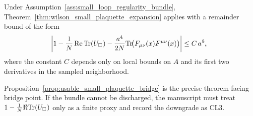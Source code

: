 \begin{proposition}
\label{prop:usable_small_plaquette_bridge}
\MathTag Under Assumption~\ref{ass:small_loop_regularity_bundle}, Theorem~\ref{thm:wilson_small_plaquette_expansion} applies with a remainder bound of the form
\[
\left|
1-\frac{1}{N}\operatorname{Re}\mathrm{Tr}(U_\square)
-\frac{a^{4}}{2N}\mathrm{Tr}\!\bigl(F_{\mu\nu}(x)F^{\mu\nu}(x)\bigr)
\right|
\le C\,a^{6},
\]
where the constant $C$ depends only on local bounds on $A$ and its first two derivatives in the sampled neighborhood.
\end{proposition}

\AuditTag Proposition~\ref{prop:usable_small_plaquette_bridge} is the precise theorem-facing bridge point.
If the bundle cannot be discharged, the manuscript must treat $1-\frac1N\Re\mathrm{Tr}(U_\square)$ only as a finite proxy and record the downgrade as CL3.

